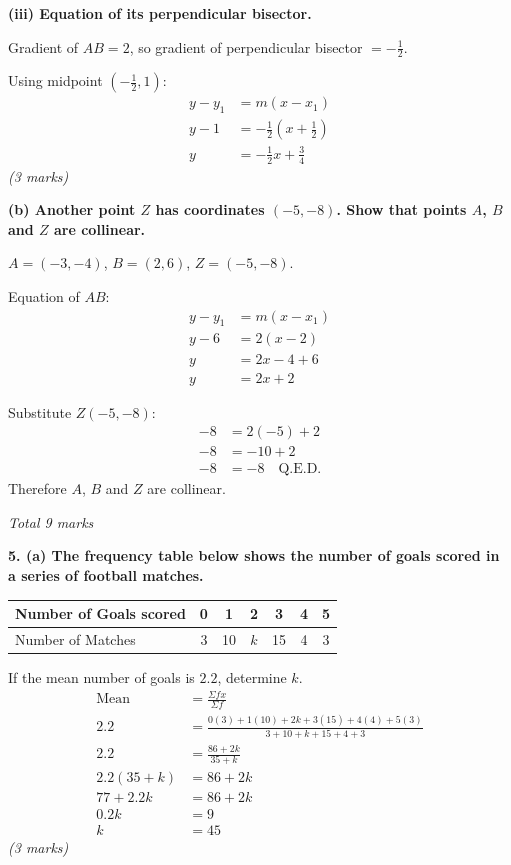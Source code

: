 \documentclass[12pt,a4paper]{article}
\newcommand{\qhead}[1]{\vspace{0.6em}\noindent\textbf{\large #1}\par\vspace{0.3em}}
\newcommand{\subhead}[1]{\vspace{0.3em}\noindent\textbf{#1}\par}
\newcommand{\qmarks}[1]{\hfill\textit{(#1)}}
\begin{document}
\subhead{(iii) Equation of its perpendicular bisector.}

Gradient of $AB = 2$, so gradient of perpendicular bisector $= -\tfrac{1}{2}$.

Using midpoint $\left( -\tfrac{1}{2}, 1 \right)$:
\begin{align*}
y - y_1 &= m(x - x_1) \\
y - 1 &= -\tfrac{1}{2}\left(x + \tfrac{1}{2}\right) \\
y &= -\tfrac{1}{2}x + \tfrac{3}{4}
\end{align*}
\qmarks{3 marks}

\subhead{(b) Another point $Z$ has coordinates $(-5,-8)$. Show that points $A$, $B$ and $Z$ are collinear.}

$A = (-3,-4)$, $B = (2,6)$, $Z = (-5,-8)$.

Equation of $AB$:
\begin{align*}
y - y_1 &= m(x - x_1) \\
y - 6 &= 2(x - 2) \\
y &= 2x - 4 + 6 \\
y &= 2x + 2
\end{align*}

Substitute $Z(-5,-8)$:
\begin{align*}
-8 &= 2(-5) + 2 \\
-8 &= -10 + 2 \\
-8 &= -8 \quad \text{Q.E.D.}
\end{align*}
Therefore $A$, $B$ and $Z$ are collinear.

\hfill\textit{Total 9 marks}

\newpage
\qhead{5. (a) The frequency table below shows the number of goals scored in a series of football matches.}

\begin{center}
\begin{tabular}{|l|c|c|c|c|c|c|}
\hline
Number of Goals scored & 0 & 1 & 2 & 3 & 4 & 5 \\ \hline
Number of Matches & 3 & 10 & $k$ & 15 & 4 & 3 \\ \hline
\end{tabular}
\end{center}

If the mean number of goals is $2.2$, determine $k$.
\begin{align*}
\text{Mean} &= \frac{\Sigma fx}{\Sigma f} \\
2.2 &= \frac{0(3) + 1(10) + 2k + 3(15) + 4(4) + 5(3)}{3 + 10 + k + 15 + 4 + 3} \\
2.2 &= \frac{86 + 2k}{35 + k} \\
2.2(35 + k) &= 86 + 2k \\
77 + 2.2k &= 86 + 2k \\
0.2k &= 9 \\
k &= 45
\end{align*}
\qmarks{3 marks}
\end{document}
